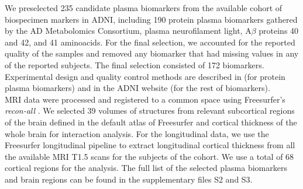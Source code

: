 \begin{table}[!htbp]
\centering
{}
\caption[Demographic information of the studied cohort at baseline.]{Demographic information of the studied cohort at baseline. Categorical variables are expressed as counts and percentages. Continuous variables are expressed as mean $\pm$ standard deviation. CN: Cognitive normal. MCI: Mild cognitive impairment. AD: Alzheimer's disease. APOE $\varepsilon4$: Apolipoprotein $\varepsilon4$.  MMSE: mini-mental state examination.}
\label{tab:data}
\end{table}

We preselected 235 candidate plasma biomarkers from the available cohort of biospecimen markers in ADNI, including 190 protein plasma biomarkers gathered by the AD Metabolomics Consortium, plasma neurofilament light, A$\beta$ proteins 40 and 42, and 41 aminoacids. For the final selection, we accounted for the reported quality of the samples and removed any biomarker that had missing values in any of the reported subjects. The final selection consisted of 172 biomarkers. Experimental design and quality control methods are described in \cite{DataPrimer} (for protein plasma biomarkers) and in the ADNI website (for the rest of biomarkers). \\

MRI data were processed and registered to a common space using Freesurfer's \textit{recon-all} \cite{Fischl2012}. We selected 39 volumes of structures from relevant subcortical regions of the brain defined in the default atlas of Freesurfer \cite{Fischl2002} and cortical thickness of the whole brain for interaction analysis. For the longitudinal data, we use the Freesurfer longitudinal pipeline \cite{Reuter2012} to extract longitudinal cortical thickness from all the available MRI T1.5 scans for the subjects of the cohort. We use a total of 68 cortical regions for the analysis. The full list of the selected plasma biomarkers and brain regions can be found in the supplementary files S2 and S3. \\

